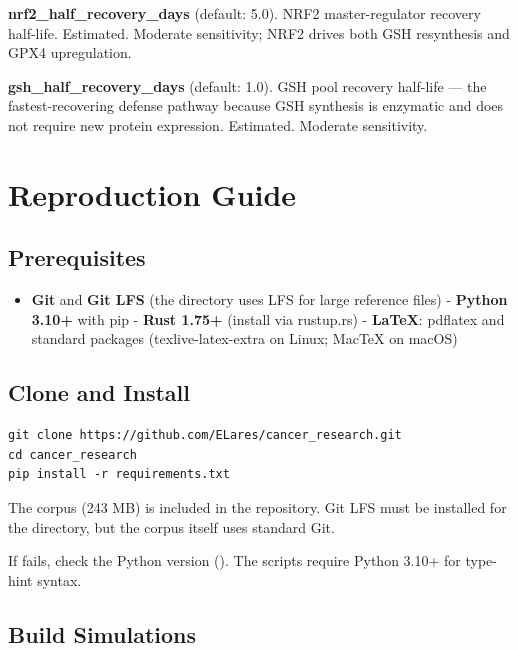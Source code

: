 \documentclass[11pt,twoside,openright]{report}
\begin{document}
\textbf{nrf2\_half\_recovery\_days} (default: 5.0). NRF2 master-regulator recovery half-life. Estimated. Moderate sensitivity; NRF2 drives both GSH resynthesis and GPX4 upregulation.

\textbf{gsh\_half\_recovery\_days} (default: 1.0). GSH pool recovery half-life --- the fastest-recovering defense pathway because GSH synthesis is enzymatic and does not require new protein expression. Estimated. Moderate sensitivity.
\dinkus
\chapter{Reproduction Guide}

\section{Prerequisites}

\begin{itemize}
\item \textbf{Git} and \textbf{Git LFS} (the  directory uses LFS for large reference files)
- \textbf{Python 3.10+} with pip
- \textbf{Rust 1.75+} (install via rustup.rs)
- \textbf{LaTeX}: pdflatex and standard packages (texlive-latex-extra on Linux; MacTeX on macOS)
\end{itemize}

\section{Clone and Install}

\begin{bookterminal}
\begin{verbatim}
git clone https://github.com/ELares/cancer_research.git
cd cancer_research
pip install -r requirements.txt
\end{verbatim}
\end{bookterminal}

The corpus (243 MB) is included in the repository. Git LFS must be installed for the  directory, but the corpus itself uses standard Git.

If  fails, check the Python version (). The scripts require Python 3.10+ for type-hint syntax.

\section{Build Simulations}
\end{document}
